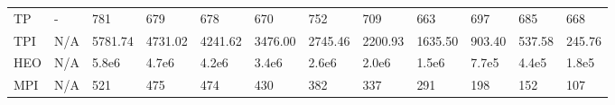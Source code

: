 \begin{table*}
{\begin{tabular}{llllllllllll}
TP       &              - &                781 &                679 &                678 &                670 &                752 &                709 &                663 &               697 &                685 &                668 \\
TPI      &            N/A &            5781.74 &            4731.02 &            4241.62 &            3476.00 &            2745.46 &            2200.93 &            1635.50 &            903.40 &             537.58 &             245.76 \\
HEO      &            N/A &              5.8e6 &              4.7e6 &              4.2e6 &              3.4e6 &              2.6e6 &              2.0e6 &              1.5e6 &             7.7e5 &              4.4e5 &              1.8e5 \\
MPI      &            N/A &                521 &                475 &                474 &                430 &                382 &                337 &                291 &               198 &                152 &                107 \\
\bottomrule
\end{tabular}}
\end{table*}



